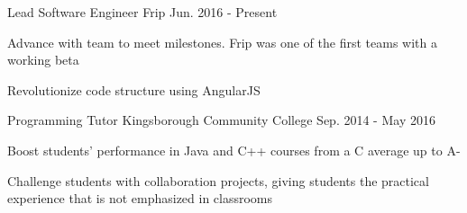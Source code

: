 \begin{cventries}

\iftrue
  \cventry
    {Lead Software Engineer} %
    {Frip} %
	{Jun. 2016 - Present} %
    {} %
    {
      \begin{cvitems} %
		\item {Advance with team to meet milestones. Frip was one of the first
		  teams with a working beta}
		\item {Revolutionize code structure using AngularJS}
      \end{cvitems}
    }
\fi

\iftrue
  \cventry
    {Programming Tutor} %
    {Kingsborough Community College} %
	{Sep. 2014 - May 2016} %
    {} %
    {
      \begin{cvitems} %
		\item {Boost students' performance in Java and C++ courses from a C average up to A-}
		\item {Challenge students with collaboration projects, giving students the practical experience that is not emphasized in classrooms}
      \end{cvitems}
    }
\fi


\end{cventries}
